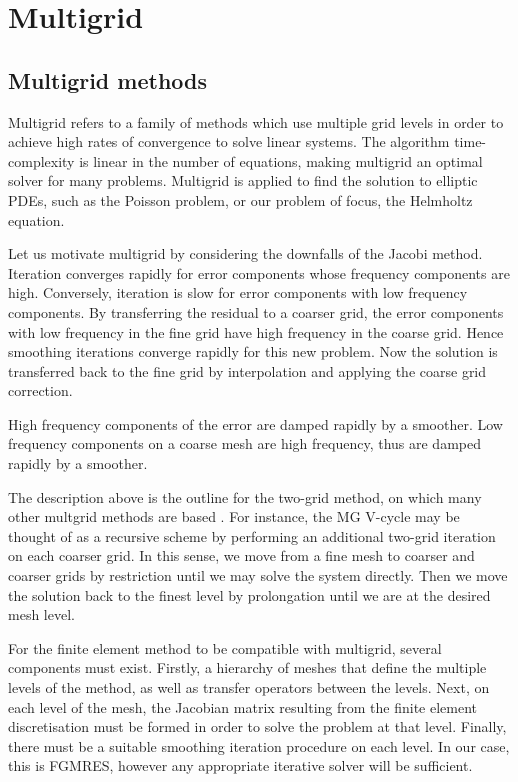 \chapter{Multigrid}


\section{Multigrid methods}

Multigrid refers to a family of methods which use multiple grid levels in order to achieve high rates of convergence to solve linear systems.
The algorithm time-complexity is linear in the number of equations, making multigrid an optimal solver for many problems.
Multigrid is applied to find the solution to elliptic PDEs, such as the Poisson problem, or our problem of focus, the Helmholtz equation.

Let us motivate multigrid by considering the downfalls of the Jacobi method.
Iteration converges rapidly for error components whose frequency components are high.
Conversely, iteration is slow for error components with low frequency components.
By transferring the residual to a coarser grid, the error components with low frequency in the fine grid have high frequency in the coarse grid.
Hence smoothing iterations converge rapidly for this new problem.
Now the solution is transferred back to the fine grid by interpolation and applying the coarse grid correction.

High frequency components of the error are damped rapidly by a smoother.
Low frequency components on a coarse mesh are high frequency, thus are damped rapidly by a smoother.

The description above is the outline for the two-grid method, on which many other multgrid methods are based \cite{hackbusch}.
For instance, the MG V-cycle may be thought of as a recursive scheme by performing an additional two-grid iteration on each coarser grid.
In this sense, we move from a fine mesh to coarser and coarser grids by restriction until we may solve the system directly.
Then we move the solution back to the finest level by prolongation until we are at the desired mesh level. 

For the finite element method to be compatible with multigrid, several components must exist.
Firstly, a hierarchy of meshes that define the multiple levels of the method, as well as transfer operators between the levels.
Next, on each level of the mesh, the Jacobian matrix resulting from the finite element discretisation must be formed in order to solve the problem at that level.
Finally, there must be  a suitable smoothing iteration procedure on each level.
In our case, this is FGMRES, however any appropriate iterative solver will be sufficient.





